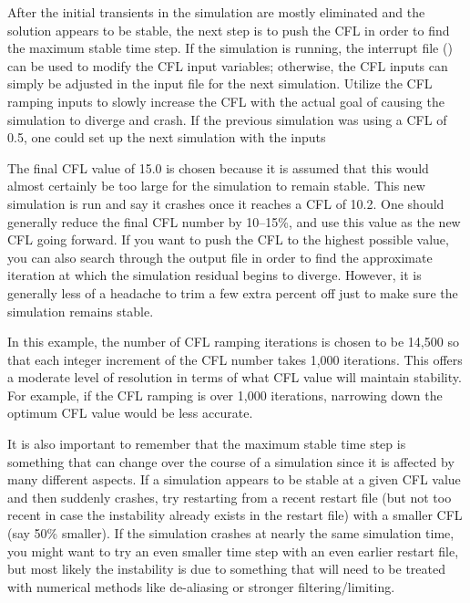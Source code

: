 After the initial transients in the simulation are mostly eliminated and the
solution appears to be stable, the next step is to push the CFL in order to find
the maximum stable time step.
%
If the simulation is running, the interrupt file 
() can be used to modify the CFL input
variables; otherwise, the CFL inputs can simply be adjusted in the input file
for the next simulation.
%
Utilize the CFL ramping inputs to slowly increase the CFL with the actual goal
of causing the simulation to diverge and crash.
%
If the previous simulation was using a CFL of 0.5, one could set up the next
simulation with the inputs
%
\begin{InputExample}
  \item[{\inptext{CFL\_Ramping\_Beg = 0.5}}]
  \item[{\inptext{CFL\_Ramping\_End = 15.0}}]
  \item[{\inptext{CFL\_Ramping\_Iterations = 14500}}]
\end{InputExample}
%
The final CFL value of 15.0 is chosen because it is assumed that this would
almost certainly be too large for the simulation to remain stable.
%
This new simulation is run and say it crashes once it reaches a CFL of 10.2.
%
One should generally reduce the final CFL number by 10--15\%, and use this
value as the new CFL going forward.
%
If you want to push the CFL to the highest possible value, you can also search
through the output file  in order to find the approximate
iteration at which the simulation residual begins to diverge.
%
However, it is generally less of a headache to trim a few extra percent off
just to make sure the simulation remains stable. 


In this example, the number of CFL ramping iterations is chosen to be 14,500 so
that each integer increment of the CFL number takes 1,000 iterations.
%
This offers a moderate level of resolution in terms of what CFL value will
maintain stability.
%
For example, if the CFL ramping is over 1,000 iterations, narrowing down the
optimum CFL value would be less accurate.


It is also important to remember that the maximum stable time step is something
that can change over the course of a simulation since it is affected by many
different aspects.
%
If a simulation appears to be stable at a given CFL value and then suddenly
crashes, try restarting from a recent restart file (but not too recent in case
the instability already exists in the restart file) with a smaller CFL (say 50\%
smaller).
%
If the simulation crashes at nearly the same simulation time, you might want
to try an even smaller time step with an even earlier restart file, but most
likely the instability is due to something that will need to be treated with
numerical methods like de-aliasing or stronger filtering\slash limiting.

